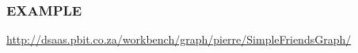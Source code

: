 \begin{frame}[fragile]
  \frametitle{EXAMPLE}
  \begin{center}
    \url{http://dsaas.pbit.co.za/workbench/graph/pierre/SimpleFriendsGraph/}
  \end{center}
\end{frame}